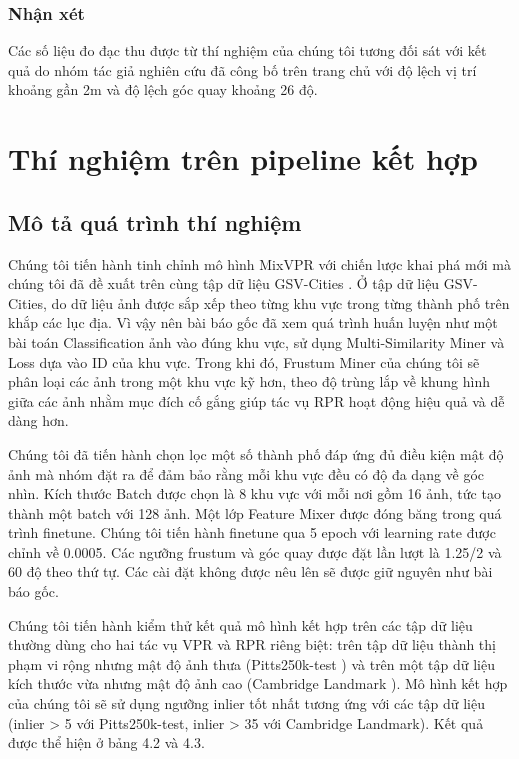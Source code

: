 \subsubsection*{Nhận xét}

Các số liệu đo đạc thu được từ thí nghiệm của chúng tôi tương đối sát với kết quả do nhóm tác giả nghiên cứu đã công bố trên trang chủ với độ lệch vị trí khoảng gần 2m và độ lệch góc quay khoảng 26 độ.

\section{Thí nghiệm trên pipeline kết hợp}
\subsection*{Mô tả quá trình thí nghiệm}

Chúng tôi tiến hành tinh chỉnh mô hình MixVPR \cite{alibey2023mixvpr} với chiến lược khai phá mới mà chúng tôi đã đề xuất trên cùng tập dữ liệu GSV-Cities \cite{Ali_bey_2022}. Ở tập dữ liệu GSV-Cities, do dữ liệu ảnh được sắp xếp theo từng khu vực trong từng thành phố trên khắp các lục địa. Vì vậy nên bài báo gốc đã xem quá trình huấn luyện như một bài toán Classification ảnh vào đúng khu vực, sử dụng Multi-Similarity Miner và Loss \cite{wang2019multi} dựa vào ID của khu vực. Trong khi đó, Frustum Miner của chúng tôi sẽ phân loại các ảnh trong một khu vực kỹ hơn, theo độ trùng lắp về khung hình giữa các ảnh nhằm mục đích cố gắng giúp tác vụ RPR hoạt động hiệu quả và dễ dàng hơn. 

Chúng tôi đã tiến hành chọn lọc một số thành phố đáp ứng đủ điều kiện mật độ ảnh mà nhóm đặt ra để đảm bảo rằng mỗi khu vực đều có độ đa dạng về góc nhìn. Kích thước Batch được chọn là 8 khu vực với mỗi nơi gồm 16 ảnh, tức tạo thành một batch với 128 ảnh. Một lớp Feature Mixer được đóng băng trong quá trình finetune. Chúng tôi tiến hành finetune qua 5 epoch với learning rate được chỉnh về 0.0005. Các ngưỡng frustum và góc quay được đặt lần lượt là 1.25/2 và 60 độ theo thứ tự. Các cài đặt không được nêu lên sẽ được giữ nguyên như bài báo gốc.

Chúng tôi tiến hành kiểm thử kết quả mô hình kết hợp trên các tập dữ liệu thường dùng cho hai tác vụ VPR và RPR riêng biệt: trên tập dữ liệu thành thị phạm vi rộng nhưng mật độ ảnh thưa (Pitts250k-test \cite{6618963}) và trên một tập dữ liệu kích thước vừa nhưng mật độ ảnh cao (Cambridge Landmark \cite{kendall2016posenet}). Mô hình kết hợp của chúng tôi sẽ sử dụng ngưỡng inlier tốt nhất tương ứng với các tập dữ liệu (inlier > 5 với Pitts250k-test, inlier > 35 với Cambridge Landmark). Kết quả được thể hiện ở bảng 4.2 và 4.3.

